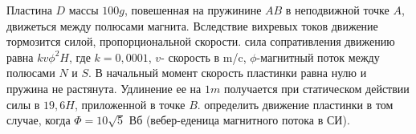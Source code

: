Пластина $D$ массы $100 g$, повешенная на пружинине $AB$ в неподвижной точке
$A$, движеться между полюсами магнита. Вследствие вихревых токов движение 
тормозится силой, пропорциональной скорости. сила сопративления движению
равна $kv\phi^2 H$, где $ k=0,0001$, $v$- скорость в m/c, $\phi$-магнитный поток 
между полюсами $N$ и $S$. В начальный момент скорость пластинки равна
нулю и пружина не растянута. Удлинение ее на $1 m$ получается при статическом
действии силы в $19,6 H$, приложенной в точке $B$. определить движение 
пластинки в том случае, когда $\Phi=10\sqrt{5}$ Вб (вебер-еденица магнитного
потока в СИ).
